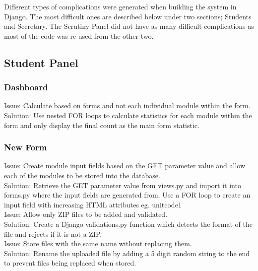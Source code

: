 \documentclass[../main.tex]{subfiles}
\begin{document}
\raggedright
Different types of complications were generated when building the system in Django. The most difficult ones are described below under two sections; Students and Secretary. The Scrutiny Panel did not have as many difficult complications as most of the code was re-used from the other two. 

\subsection{Student Panel}

\subsubsection{Dashboard}
Issue: Calculate based on forms and not each individual module within the form. \\
Solution: Use nested FOR loops to calculate statistics for each module within the form and only display the final count as the main form statistic.                                                                  \\[2mm]


\subsubsection{New Form}
Issue: Create module input fields based on the GET parameter value and allow each of the modules to be stored into the database. \\
Solution: Retrieve the GET parameter value from views.py and import it into forms.py where the input fields are generated from. Use a FOR loop to create an input field with increasing HTML attributes eg. unitcode1 \\[2mm]

Issue: Allow only ZIP files to be added and validated.                                                                 \\
Solution: Create a Django validations.py function which detects the format of the file and rejects if it is not a ZIP.                                                                                               \\[2mm]

Issue: Store files with the same name without replacing them.                                                                   \\
Solution: Rename the uploaded file by adding a 5 digit random string to the end to prevent files being replaced when stored.                                                                                          \\[2mm]
\end{document}
